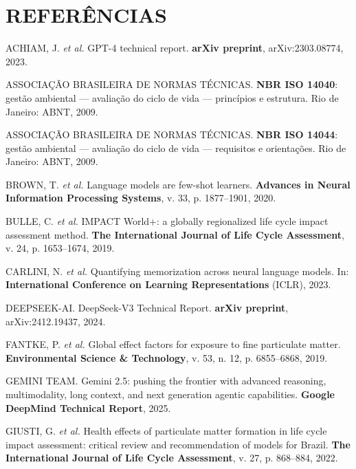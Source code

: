 \documentclass[12pt,a4paper]{article}
\begin{document}
\section*{REFERÊNCIAS}

\begingroup
\raggedright
\setlength{\parindent}{0pt}
\setlength{\parskip}{0pt}
\scriptsize
{}

\noindent ACHIAM, J. \emph{et al.} GPT-4 technical report. \textbf{arXiv preprint}, arXiv:2303.08774, 2023.

\noindent ASSOCIAÇÃO BRASILEIRA DE NORMAS TÉCNICAS. \textbf{NBR ISO 14040}: gestão ambiental --- avaliação do ciclo de vida --- princípios e estrutura. Rio de Janeiro: ABNT, 2009.

\noindent ASSOCIAÇÃO BRASILEIRA DE NORMAS TÉCNICAS. \textbf{NBR ISO 14044}: gestão ambiental --- avaliação do ciclo de vida --- requisitos e orientações. Rio de Janeiro: ABNT, 2009.

\noindent BROWN, T. \emph{et al.} Language models are few-shot learners. \textbf{Advances in Neural Information Processing Systems}, v. 33, p. 1877--1901, 2020.

\noindent BULLE, C. \emph{et al.} IMPACT World+: a globally regionalized life cycle impact assessment method. \textbf{The International Journal of Life Cycle Assessment}, v. 24, p. 1653--1674, 2019.

\noindent CARLINI, N. \emph{et al.} Quantifying memorization across neural language models. In: \textbf{International Conference on Learning Representations} (ICLR), 2023.

\noindent DEEPSEEK-AI. DeepSeek-V3 Technical Report. \textbf{arXiv preprint}, arXiv:2412.19437, 2024.

\noindent FANTKE, P. \emph{et al.} Global effect factors for exposure to fine particulate matter. \textbf{Environmental Science \& Technology}, v. 53, n. 12, p. 6855--6868, 2019.

\noindent GEMINI TEAM. Gemini 2.5: pushing the frontier with advanced reasoning, multimodality, long context, and next generation agentic capabilities. \textbf{Google DeepMind Technical Report}, 2025.

\noindent GIUSTI, G. \emph{et al.} Health effects of particulate matter formation in life cycle impact assessment: critical review and recommendation of models for Brazil. \textbf{The International Journal of Life Cycle Assessment}, v. 27, p. 868--884, 2022.
\end{document}
